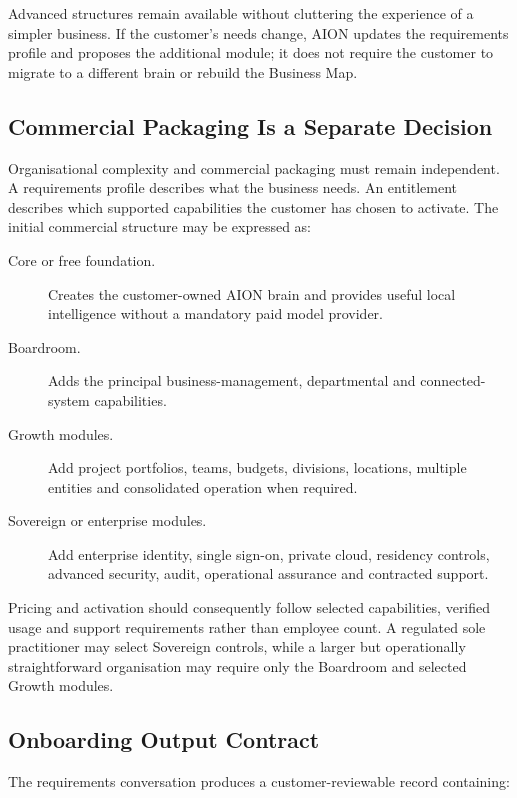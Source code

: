 Advanced structures remain available without cluttering the experience of a simpler business.  If
the customer's needs change, AION updates the requirements profile and proposes the additional
module; it does not require the customer to migrate to a different brain or rebuild the Business Map.

\subsection{Commercial Packaging Is a Separate Decision}

Organisational complexity and commercial packaging must remain independent.  A requirements
profile describes what the business needs.  An entitlement describes which supported capabilities
the customer has chosen to activate.  The initial commercial structure may be expressed as:

\begin{description}
  \item[Core or free foundation.] Creates the customer-owned AION brain and provides useful local
        intelligence without a mandatory paid model provider.
  \item[Boardroom.] Adds the principal business-management, departmental and connected-system
        capabilities.
  \item[Growth modules.] Add project portfolios, teams, budgets, divisions, locations, multiple
        entities and consolidated operation when required.
  \item[Sovereign or enterprise modules.] Add enterprise identity, single sign-on, private cloud,
        residency controls, advanced security, audit, operational assurance and contracted support.
\end{description}

Pricing and activation should consequently follow selected capabilities, verified usage and support
requirements rather than employee count.  A regulated sole practitioner may select Sovereign
controls, while a larger but operationally straightforward organisation may require only the
Boardroom and selected Growth modules.

\subsection{Onboarding Output Contract}

The requirements conversation produces a customer-reviewable record containing:

